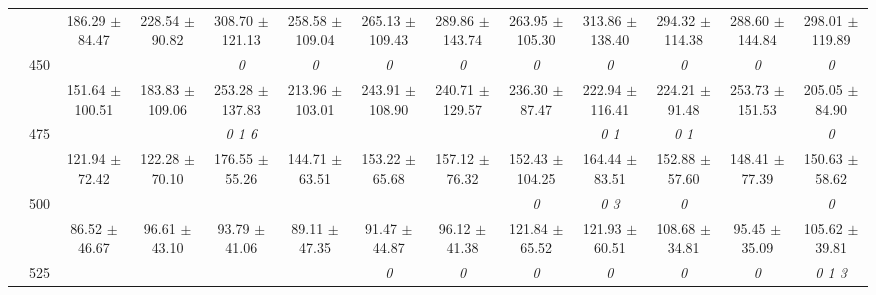 \begin{table}[h]
{\begin{tabular}{
        ccccccccccccc}
 & & \cellcolor[HTML]{EFEFEF} 186.29 $\pm$ 84.47& \cellcolor[HTML]{EFEFEF} 228.54 $\pm$ 90.82& \cellcolor[HTML]{EFEFEF} 308.70 $\pm$ 121.13& \cellcolor[HTML]{EFEFEF} 258.58 $\pm$ 109.04& \cellcolor[HTML]{EFEFEF} 265.13 $\pm$ 109.43& \cellcolor[HTML]{EFEFEF} 289.86 $\pm$ 143.74& \cellcolor[HTML]{EFEFEF} 263.95 $\pm$ 105.30& \cellcolor[HTML]{EFEFEF} 313.86 $\pm$ 138.40& \cellcolor[HTML]{EFEFEF} 294.32 $\pm$ 114.38& \cellcolor[HTML]{EFEFEF} 288.60 $\pm$ 144.84& \cellcolor[HTML]{EFEFEF} 298.01 $\pm$ 119.89 \\ 
 & \multirow{2}{*}{450}& & & \textit{ 0 }& \textit{ 0 }& \textit{ 0 }& \textit{ 0 }& \textit{ 0 }& \textit{ 0 }& \textit{ 0 }& \textit{ 0 }& \textit{ 0 } \\ 
 & & 151.64 $\pm$ 100.51& 183.83 $\pm$ 109.06& 253.28 $\pm$ 137.83& 213.96 $\pm$ 103.01& 243.91 $\pm$ 108.90& 240.71 $\pm$ 129.57& 236.30 $\pm$ 87.47& 222.94 $\pm$ 116.41& 224.21 $\pm$ 91.48& 253.73 $\pm$ 151.53& 205.05 $\pm$ 84.90 \\ 
 & \multirow{2}{*}{475}& \cellcolor[HTML]{EFEFEF} & \cellcolor[HTML]{EFEFEF} & \cellcolor[HTML]{EFEFEF} \textit{ 0 1 6 }& \cellcolor[HTML]{EFEFEF} & \cellcolor[HTML]{EFEFEF} & \cellcolor[HTML]{EFEFEF} & \cellcolor[HTML]{EFEFEF} & \cellcolor[HTML]{EFEFEF} \textit{ 0 1 }& \cellcolor[HTML]{EFEFEF} \textit{ 0 1 }& \cellcolor[HTML]{EFEFEF} & \cellcolor[HTML]{EFEFEF} \textit{ 0 } \\ 
 & & \cellcolor[HTML]{EFEFEF} 121.94 $\pm$ 72.42& \cellcolor[HTML]{EFEFEF} 122.28 $\pm$ 70.10& \cellcolor[HTML]{EFEFEF} 176.55 $\pm$ 55.26& \cellcolor[HTML]{EFEFEF} 144.71 $\pm$ 63.51& \cellcolor[HTML]{EFEFEF} 153.22 $\pm$ 65.68& \cellcolor[HTML]{EFEFEF} 157.12 $\pm$ 76.32& \cellcolor[HTML]{EFEFEF} 152.43 $\pm$ 104.25& \cellcolor[HTML]{EFEFEF} 164.44 $\pm$ 83.51& \cellcolor[HTML]{EFEFEF} 152.88 $\pm$ 57.60& \cellcolor[HTML]{EFEFEF} 148.41 $\pm$ 77.39& \cellcolor[HTML]{EFEFEF} 150.63 $\pm$ 58.62 \\ 
 & \multirow{2}{*}{500}& & & & & & & \textit{ 0 }& \textit{ 0 3 }& \textit{ 0 }& & \textit{ 0 } \\ 
 & & 86.52 $\pm$ 46.67& 96.61 $\pm$ 43.10& 93.79 $\pm$ 41.06& 89.11 $\pm$ 47.35& 91.47 $\pm$ 44.87& 96.12 $\pm$ 41.38& 121.84 $\pm$ 65.52& 121.93 $\pm$ 60.51& 108.68 $\pm$ 34.81& 95.45 $\pm$ 35.09& 105.62 $\pm$ 39.81 \\ 
 & \multirow{2}{*}{525}& \cellcolor[HTML]{EFEFEF} & \cellcolor[HTML]{EFEFEF} & \cellcolor[HTML]{EFEFEF} & \cellcolor[HTML]{EFEFEF} & \cellcolor[HTML]{EFEFEF} \textit{ 0 }& \cellcolor[HTML]{EFEFEF} \textit{ 0 }& \cellcolor[HTML]{EFEFEF} \textit{ 0 }& \cellcolor[HTML]{EFEFEF} \textit{ 0 }& \cellcolor[HTML]{EFEFEF} \textit{ 0 }& \cellcolor[HTML]{EFEFEF} \textit{ 0 }& \cellcolor[HTML]{EFEFEF} \textit{ 0 1 3 } \\ 

\end{tabular}}
\end{table}
